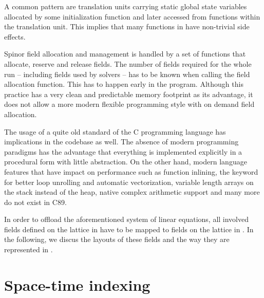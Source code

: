 A common pattern are translation units carrying static global state variables allocated by some initialization function and later accessed from functions within the translation unit. This implies that many functions in \openqxd have non-trivial side effects.%

Spinor field allocation and management is handled by a set of functions that allocate, reserve and release fields. The number of fields required for the whole run -- including fields used by solvers -- has to be known when calling the field allocation function. This has to happen early in the program. Although this practice has a very clean and predictable memory footprint as its advantage, it does not allow a more modern flexible programming style with on demand field allocation.

The usage of a quite old standard of the C programming language has implications in the codebase as well. The absence of modern programming paradigms has the advantage that everything is implemented explicitly in a procedural form with little abstraction. On the other hand, modern language features that have impact on performance such as function inlining, the  keyword for better loop unrolling and automatic vectorization, variable length arrays on the stack instead of the heap, native complex arithmetic support and many more do not exist in C89.

In order to offload the aforementioned system of linear equations, all involved fields defined on the lattice in \openqxd have to be mapped to fields on the lattice in \quda.
In the following, we discus the layouts of these fields and the way they are represented in \openqxd.

\section{Space-time indexing}
\label{sec:openqxd:index}

